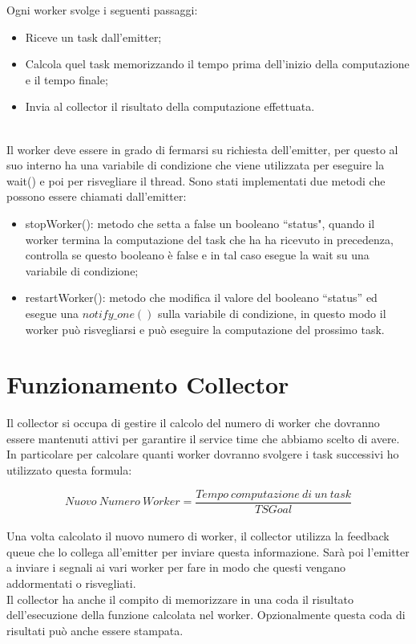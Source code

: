 \documentclass[12pt]{report}
\begin{document}
Ogni worker svolge i seguenti passaggi:
\begin{itemize}
\item Riceve un task dall'emitter;
\item Calcola quel task memorizzando il tempo prima dell'inizio della computazione e il tempo finale;
\item Invia al collector il risultato della computazione effettuata.
\end{itemize}\\Il worker deve essere in grado di fermarsi su richiesta dell'emitter, per questo al suo interno ha una variabile di condizione che viene utilizzata per eseguire la wait() e poi per risvegliare il thread.
Sono stati implementati due metodi che possono essere chiamati dall'emitter:
\begin{itemize}
\item stopWorker(): metodo che setta a false un booleano ``status", quando il worker termina la computazione del task che ha ha ricevuto in precedenza, controlla se questo booleano è false e in tal caso esegue la wait su una variabile di condizione;
\item restartWorker(): metodo che modifica il valore del booleano ``status'' ed esegue una $notify\_one()$ sulla variabile di condizione, in questo modo il worker può risvegliarsi e può eseguire la computazione del prossimo task.
\end{itemize}

\section{Funzionamento Collector}

Il collector si occupa di gestire il calcolo del numero di worker che dovranno essere mantenuti attivi per garantire il service time che abbiamo scelto di avere.
In particolare per calcolare quanti worker dovranno svolgere i task successivi ho utilizzato questa formula:

\begin{equation}
    Nuovo \ Numero \ Worker = \frac{Tempo \ computazione \ di \ un \ task}{TSGoal}
\end{equation} \\Una volta calcolato il nuovo numero di worker, il collector utilizza la feedback queue che lo collega all'emitter per inviare questa informazione.
Sarà poi l'emitter a inviare i segnali ai vari worker per fare in modo che questi vengano addormentati o risvegliati.\\Il collector ha anche il compito di memorizzare in una coda il risultato dell'esecuzione della funzione calcolata nel worker. Opzionalmente questa coda di risultati può anche essere stampata.
\end{document}
